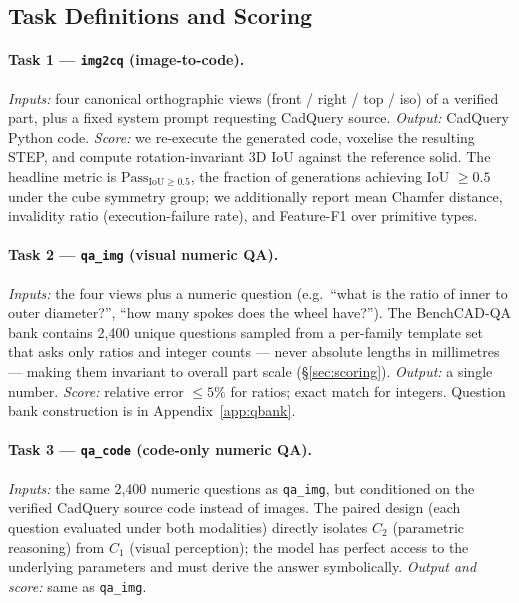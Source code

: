 \documentclass{article}
\begin{document}
\subsection{Task Definitions and Scoring}

\paragraph{Task 1 --- \texttt{img2cq} (image-to-code).} \emph{Inputs:} four canonical orthographic views (front / right / top / iso) of a verified part, plus a fixed system prompt requesting CadQuery source. \emph{Output:} CadQuery Python code. \emph{Score:} we re-execute the generated code, voxelise the resulting STEP, and compute rotation-invariant 3D IoU against the reference solid. The headline metric is $\mathrm{Pass}_{\mathrm{IoU}\geq 0.5}$, the fraction of generations achieving IoU $\geq 0.5$ under the cube symmetry group; we additionally report mean Chamfer distance, invalidity ratio (execution-failure rate), and Feature-F1 over primitive types.

\paragraph{Task 2 --- \texttt{qa\_img} (visual numeric QA).} \emph{Inputs:} the four views plus a numeric question (e.g.\ ``what is the ratio of inner to outer diameter?'', ``how many spokes does the wheel have?''). The BenchCAD-QA bank contains 2{,}400 unique questions sampled from a per-family template set that asks only ratios and integer counts --- never absolute lengths in millimetres --- making them invariant to overall part scale (\S\ref{sec:scoring}). \emph{Output:} a single number. \emph{Score:} relative error $\leq 5\%$ for ratios; exact match for integers. Question bank construction is in Appendix~\ref{app:qbank}.

\paragraph{Task 3 --- \texttt{qa\_code} (code-only numeric QA).} \emph{Inputs:} the same 2{,}400 numeric questions as \texttt{qa\_img}, but conditioned on the verified CadQuery source code instead of images. The paired design (each question evaluated under both modalities) directly isolates $C_2$ (parametric reasoning) from $C_1$ (visual perception); the model has perfect access to the underlying parameters and must derive the answer symbolically. \emph{Output and score:} same as \texttt{qa\_img}.
\end{document}
